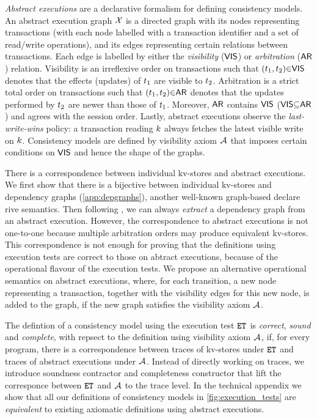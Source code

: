 

\emph{Abstract executions} \cite{ev_transactions,framework-concur} are a declarative formalism for defining consistency models. 
An abstract execution graph $\mathcal{X}$ is a directed graph with its nodes representing transactions 
(with each node labelled with a transaction identifier and a set of read/write operations), 
and its edges representing certain relations between transactions. 
Each edge is labelled by either the \emph{visibility} ($\mathsf{VIS}$) or \emph{arbitration} ($\mathsf{AR}$) relation. 
Visibility is an irreflexive order on transactions such that $(t_1,t_2) {\in} \mathsf{VIS}$ denotes that the effects (updates) of $t_1$ are visible to $t_2$. 
Arbitration is a strict total order on transactions such that $(t_1,t_2) {\in} \mathsf{AR}$ denotes that the updates performed by $t_2$ are newer than those of $t_1$. 
Moreover, $\mathsf{AR}$ contains $\mathsf{VIS}$ ($\mathsf{VIS} {\subseteq} \mathsf{AR}$) and agrees with the session order.
Lastly, abstract executions observe the \emph{last-write-wins} policy: 
a transaction reading $k$ always fetches the latest visible write on $k$.
Consistency models are defined by visibility axiom \( \visaxioms\) 
that imposes certain conditions on $\mathsf{VIS}$ and hence the shape of the graphs.

There is a correspondence between individual kv-stores and abstract executions.
We first show that there is a bijective between individual kv-stores and dependency graphs (\cref{app:depgraphs}),
another well-known graph-based declare rive semantics.
Then following \cite{laws}, we can always \emph{extract} a dependency graph from an abstract execution.
However, the correspondence to abstract executions is not one-to-one 
because multiple arbitration orders may produce equivalent kv-stores.
This correspondence is not enough for proving that 
the definitions using execution tests are correct to those on abtract executions, 
because of the operational flavour of the execution tests.
We propose an alternative operational semantics on abstract executions,
where, for each transition, 
a new node representing a transaction, together with the visibility edges for this new node,
is added to the graph, if the new graph satisfies the visibility axiom \( \visaxioms \).

The defintion of a consistency model using the execution test \( \et \) is \emph{correct}, 
\ie \emph{sound} and \emph{complete},
with repsect to the definition using visibility axiom \( \visaxioms \),
if, for every program, there is a correspondence
between traces of kv-stores under \( \et \) and 
traces of abstract executions under \( \visaxioms \).
Instead of directly working on traces,
we introduce soundness contractor and completeness constructor
that lift the corresponce between \( \et \) and \( \visaxioms \) to the trace level. 
In the technical appendix we show that 
all our definitions of consistency models in \cref{fig:execution_tests} 
are \emph{equivalent} to existing axiomatic definitions using abstract executions.
